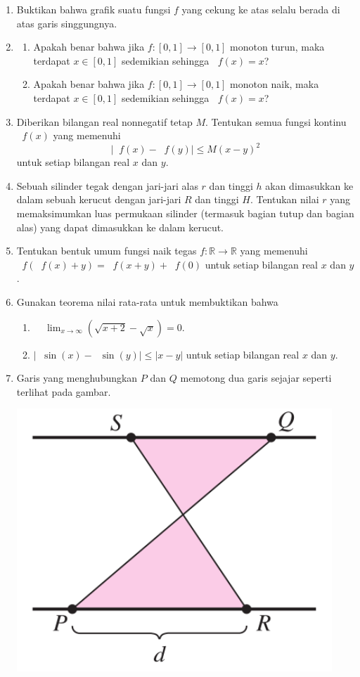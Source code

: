 \documentclass[12pt]{article}
\newcommand*\func[2]{\mathop{}\!{#1}{\left({#2}\right)}}
\newcommand*\ds[1]{\mathop{}\!\displaystyle{{#1}}}
\begin{document}
\begin{enumerate}[leftmargin=*]
		\item Buktikan bahwa grafik suatu fungsi $ f $ yang cekung ke atas selalu berada di atas garis singgungnya.
		\item
		\begin{enumerate}
			\item Apakah benar bahwa jika $ f : \left[0, 1\right] \to \left[0, 1\right] $ monoton turun, maka terdapat $ x \in \left[0, 1\right] $ sedemikian sehingga $ \func{f}{x} = x $?
			\item Apakah benar bahwa jika $ f : \left[0, 1\right] \to \left[0, 1\right] $ monoton naik, maka terdapat $ x \in \left[0, 1\right] $ sedemikian sehingga $ \func{f}{x} = x $?
		\end{enumerate}
		\item Diberikan bilangan real nonnegatif tetap $ M $. Tentukan semua fungsi kontinu $ \func{f}{x} $ yang memenuhi
		\[ \left|\func{f}{x} - \func{f}{y}\right| \leq M\left(x - y\right)^{2} \]
		untuk setiap bilangan real $ x $ dan $ y $.
		\item Sebuah silinder tegak dengan jari-jari alas $ r $ dan tinggi $ h $ akan dimasukkan ke dalam sebuah kerucut dengan jari-jari $ R $ dan tinggi $ H $. Tentukan nilai $ r $ yang memaksimumkan luas permukaan silinder (termasuk bagian tutup dan bagian alas) yang dapat dimasukkan ke dalam kerucut.
		\item Tentukan bentuk umum fungsi naik tegas $ f : \mathbb{R} \to \mathbb{R} $ yang memenuhi $ \func{f}{\func{f}{x} + y} = \func{f}{x + y} + \func{f}{0} $ untuk setiap bilangan real $ x $ dan $ y $.
		\item Gunakan teorema nilai rata-rata untuk membuktikan bahwa
		\begin{enumerate}
			\item $ \ds{\func{\lim_{x \to \infty}}{\sqrt{x + 2} - \sqrt{x}}} = 0 $.
			\item $ \left|\func{\sin}{x} - \func{\sin}{y}\right| \leq \left|x - y\right| $ untuk setiap bilangan real $ x $ dan $ y $.
		\end{enumerate}
		\item Garis yang menghubungkan $ P $ dan $ Q $ memotong dua garis sejajar seperti terlihat pada gambar.
		\begin{center}
			\includegraphics[scale=0.3]{pict1.PNG}

\end{center}
\end{enumerate}
\end{document}
